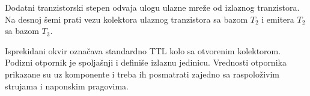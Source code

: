 Dodatni tranzistorski stepen odvaja ulogu ulazne mreže od izlaznog tranzistora. Na desnoj šemi prati vezu kolektora ulaznog tranzistora sa bazom $T_2$ i emitera $T_2$ sa bazom $T_3$.

Isprekidani okvir označava standardno TTL kolo sa otvorenim kolektorom. Podizni otpornik je spoljašnji i definiše izlaznu jedinicu. Vrednosti otpornika prikazane su uz komponente i treba ih posmatrati zajedno sa raspoloživim strujama i naponskim pragovima.
